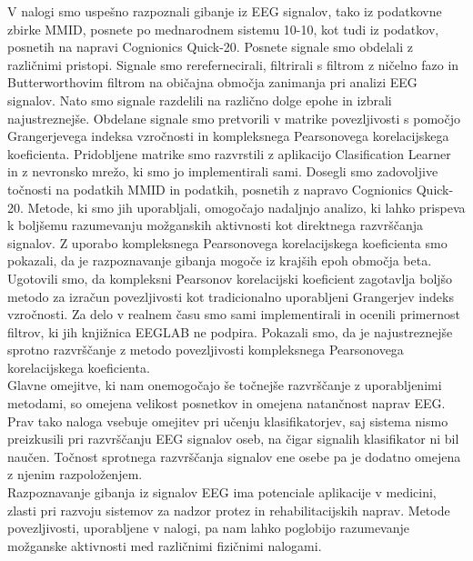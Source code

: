 \thispagestyle{fancy}
V nalogi smo uspešno razpoznali gibanje iz EEG signalov, tako iz podatkovne zbirke MMID, posnete po mednarodnem sistemu 10-10, kot tudi iz podatkov, posnetih na napravi Cognionics Quick-20. Posnete signale smo obdelali z različnimi pristopi. Signale smo rerefernecirali, filtrirali s filtrom z ničelno fazo in Butterworthovim filtrom na običajna območja zanimanja pri analizi EEG signalov. Nato smo signale razdelili na različno dolge epohe in izbrali najustreznejše. Obdelane signale smo pretvorili v matrike povezljivosti s pomočjo Grangerjevega indeksa vzročnosti in kompleksnega Pearsonovega korelacijskega koeficienta. Pridobljene matrike smo razvrstili z aplikacijo Clasification Learner in z nevronsko mrežo, ki smo jo implementirali sami. Dosegli smo zadovoljive točnosti na podatkih MMID in podatkih, posnetih z napravo Cognionics Quick-20. Metode, ki smo jih uporabljali, omogočajo nadaljnjo analizo, ki lahko prispeva k boljšemu razumevanju možganskih aktivnosti kot direktnega razvrščanja signalov. Z uporabo kompleksnega Pearsonovega korelacijskega koeficienta smo pokazali, da je razpoznavanje gibanja mogoče iz krajših epoh območja beta. Ugotovili smo, da kompleksni Pearsonov korelacijski koeficient zagotavlja boljšo metodo za izračun povezljivosti kot tradicionalno uporabljeni Grangerjev indeks vzročnosti. Za delo v realnem času smo sami implementirali in ocenili primernost filtrov, ki jih knjižnica EEGLAB ne podpira. Pokazali smo, da je najustreznejše sprotno razvrščanje z metodo povezljivosti kompleksnega Pearsonovega korelacijskega koeficienta.\\
Glavne omejitve, ki nam onemogočajo še točnejše razvrščanje z uporabljenimi metodami,  so omejena velikost posnetkov in omejena natančnost naprav EEG. Prav tako naloga vsebuje omejitev pri učenju klasifikatorjev, saj sistema nismo preizkusili pri razvrščanju EEG signalov oseb, na čigar signalih klasifikator ni bil naučen. Točnost sprotnega razvrščanja signalov ene osebe pa je dodatno omejena z njenim razpoloženjem.\\
Razpoznavanje gibanja iz signalov EEG ima potenciale aplikacije v medicini, zlasti pri razvoju sistemov za nadzor protez in rehabilitacijskih naprav. Metode povezljivosti, uporabljene v nalogi, pa nam lahko poglobijo razumevanje možganske aktivnosti med različnimi fizičnimi nalogami.

